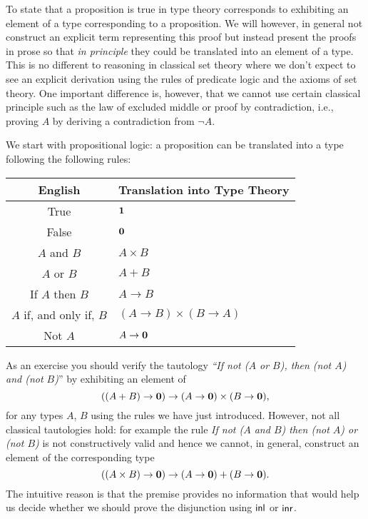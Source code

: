 To state that a proposition is true in type theory corresponds to exhibiting an element of a type corresponding to a proposition. We will however, in general not construct an explicit term representing this proof but instead present the proofs in prose so that \emph{in principle} they could be translated into an element of a type. This is no different to reasoning in classical set theory where we don't expect to see an explicit derivation using the rules of predicate logic and the axioms of set theory. One important difference is, however, that we cannot use certain classical principle such as the law of excluded middle or proof by contradiction, i.e., proving $A$ by deriving a contradiction from $\lnot A$.

We start with propositional logic: a proposition can be translated into a type following the following rules:
\begin{center}
\begin{tabular}{c|l}
  \textbf{English} & \textbf{Translation into Type Theory}\\\hline
  True & $\mathbf{1}$ \\
  False & $\mathbf{0}$ \\
  $A$ and $B$ & $A \times B$ \\
  $A$ or $B$ & $A + B$ \\
  If $A$ then $B$ & $A \to B$ \\
  $A$ if, and only if, $B$ & $(A \to B) \times (B \to A)$ \\
  Not $A$ &  $A \to \mathbf{0}$
\end{tabular}
\end{center}
As an exercise you should verify 
the tautology \emph{``If not ($A$ or $B$), then  (not $A$) and (not $B$)}'' by exhibiting an element of 
\[ ((A + B) \to \mathbf{0}) \to (A \to \mathbf{0}) \times (B \to \mathbf{0}), \]
for any types $A$, $B$ using the rules we have just introduced. However, not all classical tautologies hold: for example the rule 
\emph{If not ($A$ and $B$) then (not $A$) or (not $B$)} is not constructively valid and hence we cannot, in general, construct an element of the corresponding type
\[ ((A \times B) \to \mathbf{0}) \to (A \to \mathbf{0}) + (B \to \mathbf{0}).\]
The intuitive reason is that the premise provides no information that would help us decide whether we should prove the disjunction using $\mathsf{inl}$ or $\mathsf{inr}$.

